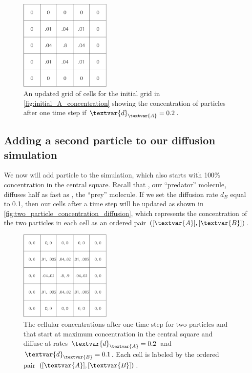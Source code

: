 \begin{figure}[h]
\centering
\mySfFamily
\includegraphics[width = 0.4\textwidth]{../images/A_concentration_slower_diffusion.png}
\caption{An updated grid of cells for the initial grid in \autoref{fig:initial_A_concentration} showing the concentration of  particles after one time step if $\textvar{d}_\textvar{A} = \text{0.2}$.}
\label{fig:A_concentration_slower_diffusion}
\end{figure}

\FloatBarrier
{}
\subsection{Adding a second particle to our diffusion simulation}

We now will add particle  to the simulation, which also starts with 100\% concentration in the central square. Recall that , our ``predator'' molecule, diffuses half as fast as , the ``prey'' molecule. If we set the diffusion rate $d_B$ equal to 0.1, then our cells after a time step will be updated as shown in \autoref{fig:two_particle_concentration_diffusion}, which represents the concentration of the two particles in each cell as an ordered pair $([\textvar{A}], [\textvar{B}])$.\\

\begin{figure}[h]
\centering
\mySfFamily
\includegraphics[width = 0.4\textwidth]{../images/two_particle_concentration_diffusion.png}
\caption{The cellular concentrations after one time step for two particles  and  that start at maximum concentration in the central square and diffuse at rates $\textvar{d}_\textvar{A} = \text{0.2}$ and $\textvar{d}_\textvar{B} = \text{0.1}$. Each cell is labeled by the ordered pair $([\textvar{A}], [\textvar{B}])$.}
\label{fig:two_particle_concentration_diffusion}
\end{figure}

